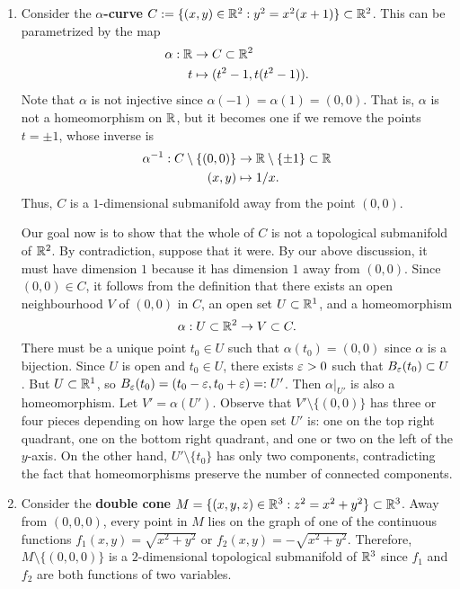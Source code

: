 \begin{enumerate}[(1)]
    \item Consider the {\bf $\alpha$-curve} $C := \{(x, y) \in \mathbb{R}^2 : y^2 = x^2(x+1)\} \subset \mathbb{R}^2$.
    This can be parametrized by the map 
    \begin{align*}
        \alpha : \mathbb{R} &\to C \subset \mathbb{R}^2 \\
        t &\mapsto (t^2 - 1, t(t^2 - 1)).
    \end{align*}
    Note that $\alpha$ is not injective since $\alpha(-1) = \alpha(1) = (0, 0)$.
    That is, $\alpha$ is not a homeomorphism on $\mathbb{R}$, but it becomes one 
    if we remove the points $t = \pm1$, whose inverse is 
    \begin{align*}
        \alpha^{-1} : C \setminus \{(0, 0)\} &\to \mathbb{R} \setminus \{\pm1\} \subset \mathbb{R} \\ 
        (x, y) &\mapsto 1/x. 
    \end{align*} 
    Thus, $C$ is a $1$-dimensional submanifold away from the point $(0, 0)$. 
    
    Our goal now is to show that the whole of $C$ is not a topological submanifold 
    of $\mathbb{R}^2$. By contradiction, suppose that it were. By our above discussion, 
    it must have dimension $1$ because it has dimension $1$ away from $(0, 0)$. 
    Since $(0, 0) \in C$, it follows from the definition that there exists an 
    open neighbourhood $V$ of $(0, 0)$ in $C$, 
    an open set $U \subset \mathbb{R}^1$, and a homeomorphism 
    \[ \alpha : U \subset \mathbb{R}^2 \to V \subset C. \] 
    There must be a unique point $t_0 \in U$ such that $\alpha(t_0) = (0, 0)$ 
    since $\alpha$ is a bijection. Since $U$ is open and $t_0 \in U$, there 
    exists $\varepsilon > 0$ such that $B_\varepsilon(t_0) \subset U$. But $U \subset \mathbb{R}^1$, 
    so $B_\varepsilon(t_0) = (t_0 - \varepsilon, t_0 + \varepsilon) =: U'$. Then $\alpha|_{U'}$ 
    is also a homeomorphism. Let $V' = \alpha(U')$. Observe that 
    $V' \setminus \{(0, 0)\}$ has three or four pieces depending on how large 
    the open set $U'$ is: one on the top right quadrant, one on the bottom right 
    quadrant, and one or two on the left of the $y$-axis. On the other hand, 
    $U' \setminus \{t_0\}$ has only two components, contradicting the fact that 
    homeomorphisms preserve the number of connected components. 

    \item Consider the {\bf double cone} $M = \{(x, y, z) \in \mathbb{R}^3 : 
    z^2 = x^2 + y^2\} \subset \mathbb{R}^3$. Away from $(0, 0, 0)$, every point in $M$ 
    lies on the graph of one of the continuous functions $f_1(x, y) =
    \sqrt{x^2+y^2}$ or $f_2(x, y) = -\sqrt{x^2 + y^2}$. Therefore, 
    $M \setminus \{(0, 0, 0)\}$ is a $2$-dimensional topological submanifold 
    of $\mathbb{R}^3$ since $f_1$ and $f_2$ are both functions of two variables. 


\end{enumerate}
